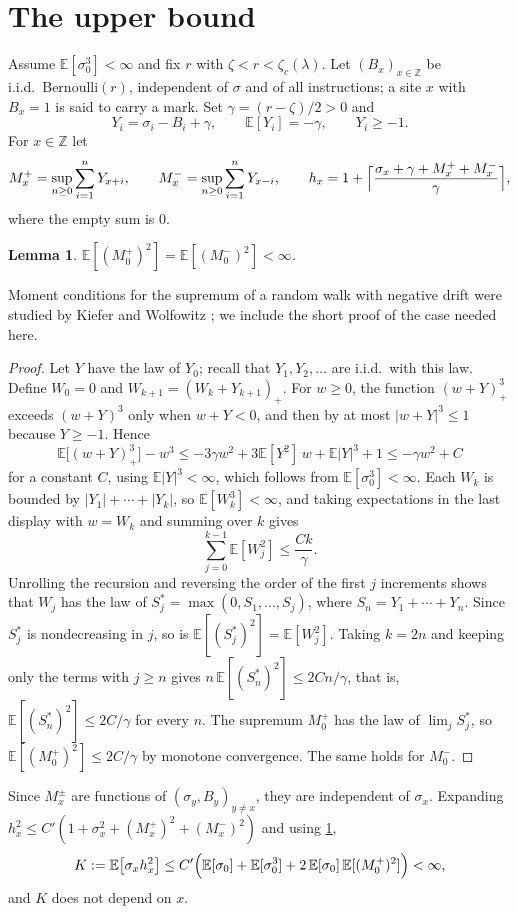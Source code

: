 \documentclass[11pt]{article}
\newtheorem{lemma}[theorem]{Lemma}
\theoremstyle{remark}
\newcommand{\Z}{\mathbb Z}
\newcommand{\E}{\mathbb E}
\newcommand{\1}{\mathbf 1}
\begin{document}
\section{The upper bound}

Assume $\E[\sigma_0^3]<\infty$ and fix $r$ with $\zeta<r<\zeta_c(\lambda)$. Let $(B_x)_{x\in\Z}$ be i.i.d.\ Bernoulli$(r)$, independent of $\sigma$ and of all instructions; a site $x$ with $B_x=1$ is said to carry a mark. Set $\gamma=(r-\zeta)/2>0$ and
\[
Y_i=\sigma_i-B_i+\gamma ,\qquad \E[Y_i]=-\gamma,\qquad Y_i\ge -1 .
\]
For $x\in\Z$ let
\[
M_x^+=\sup_{n\ge0}\sum_{i=1}^n Y_{x+i},\qquad M_x^-=\sup_{n\ge0}\sum_{i=1}^n Y_{x-i},
\qquad
h_x=1+\Bigl\lceil \frac{\sigma_x+\gamma+M_x^++M_x^-}{\gamma}\Bigr\rceil,
\]
where the empty sum is $0$.

\begin{lemma}\label{lem:sup}
$\E[(M_0^+)^2]=\E[(M_0^-)^2]<\infty$.
\end{lemma}

Moment conditions for the supremum of a random walk with negative drift were studied by Kiefer and Wolfowitz \cite{KW}; we include the short proof of the case needed here.

\begin{proof}
Let $Y$ have the law of $Y_0$; recall that $Y_1,Y_2,\dots$ are i.i.d.\ with this law. Define $W_0=0$ and $W_{k+1}=(W_k+Y_{k+1})_+$. For $w\ge0$, the function $(w+Y)_+^3$ exceeds $(w+Y)^3$ only when $w+Y<0$, and then by at most $|w+Y|^3\le1$ because $Y\ge-1$. Hence
\[
\E\bigl[(w+Y)_+^3\bigr]-w^3\le -3\gamma w^2+3\E[Y^2]\,w+\E|Y|^3+1\le -\gamma w^2+C
\]
for a constant $C$, using $\E|Y|^3<\infty$, which follows from $\E[\sigma_0^3]<\infty$. Each $W_k$ is bounded by $|Y_1|+\cdots+|Y_k|$, so $\E[W_k^3]<\infty$, and taking expectations in the last display with $w=W_k$ and summing over $k$ gives
\[
\sum_{j=0}^{k-1}\E[W_j^2]\le \frac{Ck}{\gamma}.
\]
Unrolling the recursion and reversing the order of the first $j$ increments shows that $W_j$ has the law of $S^*_j=\max(0,S_1,\dots,S_j)$, where $S_n=Y_1+\cdots+Y_n$. Since $S^*_j$ is nondecreasing in $j$, so is $\E[(S^*_j)^2]=\E[W_j^2]$. Taking $k=2n$ and keeping only the terms with $j\ge n$ gives $n\,\E[(S^*_n)^2]\le 2Cn/\gamma$, that is, $\E[(S^*_n)^2]\le 2C/\gamma$ for every $n$. The supremum $M_0^+$ has the law of $\lim_j S^*_j$, so $\E[(M_0^+)^2]\le2C/\gamma$ by monotone convergence. The same holds for $M_0^-$.
\end{proof}

Since $M_x^\pm$ are functions of $(\sigma_y,B_y)_{y\ne x}$, they are independent of $\sigma_x$. Expanding $h_x^2\le C'(1+\sigma_x^2+(M_x^+)^2+(M_x^-)^2)$ and using \cref{lem:sup},
\begin{equation}\label{eq:hmoment}
K:=\E\bigl[\sigma_x h_x^2\bigr]\le C'\Bigl(\E[\sigma_0]+\E[\sigma_0^3]+2\,\E[\sigma_0]\,\E[(M_0^+)^2]\Bigr)<\infty,
\end{equation}
and $K$ does not depend on $x$.
\end{document}
